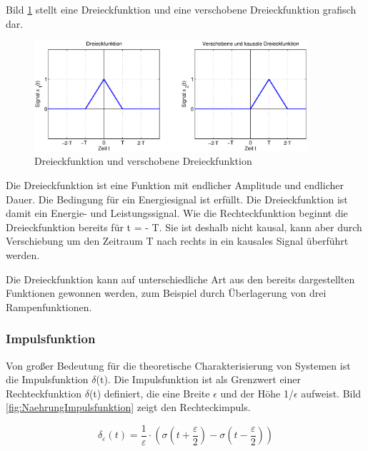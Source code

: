 \noindent Bild \ref{fig:DreieckFunktion} stellt eine Dreieckfunktion und eine verschobene Dreieckfunktion grafisch dar.

\begin{figure}[ht]
  \centerline{\includegraphics[width=0.9\textwidth]{Kapitel1/Bilder/image10.eps}}
  \caption{Dreieckfunktion und verschobene Dreieckfunktion}
  \label{fig:DreieckFunktion}
\end{figure}

\noindent Die Dreieckfunktion ist eine Funktion mit endlicher Amplitude und endlicher Dauer. Die Bedingung f\"{u}r ein Energiesignal ist erf\"{u}llt. Die Dreieckfunktion ist damit ein Energie- und Leistungssignal. Wie die Rechteckfunktion beginnt die Dreieckfunktion bereits f\"{u}r t = - T. Sie ist deshalb nicht kausal, kann aber durch Verschiebung um den Zeitraum T nach rechts in ein kausales Signal \"{u}berf\"{u}hrt werden.

\noindent Die Dreieckfunktion kann auf unterschiedliche Art aus den bereits dargestellten Funktionen gewonnen werden, zum Beispiel durch \"{U}berlagerung von drei Rampenfunktionen. 

\clearpage

\subsubsection{ Impulsfunktion}

\noindent Von gro{\ss}er Bedeutung f\"{u}r die theoretische Charakterisierung von Systemen ist die Impulsfunktion $\delta$(t). Die Impulsfunktion ist als Grenzwert einer Rechteckfunktion $\delta$(t) definiert, die eine Breite $\epsilon$ und der H\"{o}he 1/$\epsilon$ aufweist. Bild \ref{fig:NaehrungImpulsfunktion} zeigt den Rechteckimpuls.


\begin{equation}\label{eq:onethirtyfive}
\delta _{\varepsilon }(t)=\dfrac{1}{\varepsilon } \cdot \left(\sigma \left(t+\dfrac{\varepsilon }{2} \right)-\sigma \left(t-\dfrac{\varepsilon }{2} \right)\right)
\end{equation}

